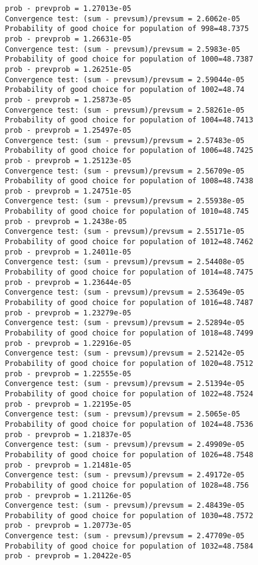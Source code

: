\documentclass[11pt,onecolumn]{article}
\begin{document}
\begin{verbatim}
prob - prevprob = 1.27013e-05
Convergence test: (sum - prevsum)/prevsum = 2.6062e-05
Probability of good choice for population of 998=48.7375
prob - prevprob = 1.26631e-05
Convergence test: (sum - prevsum)/prevsum = 2.5983e-05
Probability of good choice for population of 1000=48.7387
prob - prevprob = 1.26251e-05
Convergence test: (sum - prevsum)/prevsum = 2.59044e-05
Probability of good choice for population of 1002=48.74
prob - prevprob = 1.25873e-05
Convergence test: (sum - prevsum)/prevsum = 2.58261e-05
Probability of good choice for population of 1004=48.7413
prob - prevprob = 1.25497e-05
Convergence test: (sum - prevsum)/prevsum = 2.57483e-05
Probability of good choice for population of 1006=48.7425
prob - prevprob = 1.25123e-05
Convergence test: (sum - prevsum)/prevsum = 2.56709e-05
Probability of good choice for population of 1008=48.7438
prob - prevprob = 1.24751e-05
Convergence test: (sum - prevsum)/prevsum = 2.55938e-05
Probability of good choice for population of 1010=48.745
prob - prevprob = 1.2438e-05
Convergence test: (sum - prevsum)/prevsum = 2.55171e-05
Probability of good choice for population of 1012=48.7462
prob - prevprob = 1.24011e-05
Convergence test: (sum - prevsum)/prevsum = 2.54408e-05
Probability of good choice for population of 1014=48.7475
prob - prevprob = 1.23644e-05
Convergence test: (sum - prevsum)/prevsum = 2.53649e-05
Probability of good choice for population of 1016=48.7487
prob - prevprob = 1.23279e-05
Convergence test: (sum - prevsum)/prevsum = 2.52894e-05
Probability of good choice for population of 1018=48.7499
prob - prevprob = 1.22916e-05
Convergence test: (sum - prevsum)/prevsum = 2.52142e-05
Probability of good choice for population of 1020=48.7512
prob - prevprob = 1.22555e-05
Convergence test: (sum - prevsum)/prevsum = 2.51394e-05
Probability of good choice for population of 1022=48.7524
prob - prevprob = 1.22195e-05
Convergence test: (sum - prevsum)/prevsum = 2.5065e-05
Probability of good choice for population of 1024=48.7536
prob - prevprob = 1.21837e-05
Convergence test: (sum - prevsum)/prevsum = 2.49909e-05
Probability of good choice for population of 1026=48.7548
prob - prevprob = 1.21481e-05
Convergence test: (sum - prevsum)/prevsum = 2.49172e-05
Probability of good choice for population of 1028=48.756
prob - prevprob = 1.21126e-05
Convergence test: (sum - prevsum)/prevsum = 2.48439e-05
Probability of good choice for population of 1030=48.7572
prob - prevprob = 1.20773e-05
Convergence test: (sum - prevsum)/prevsum = 2.47709e-05
Probability of good choice for population of 1032=48.7584
prob - prevprob = 1.20422e-05

\end{verbatim}
\end{document}
